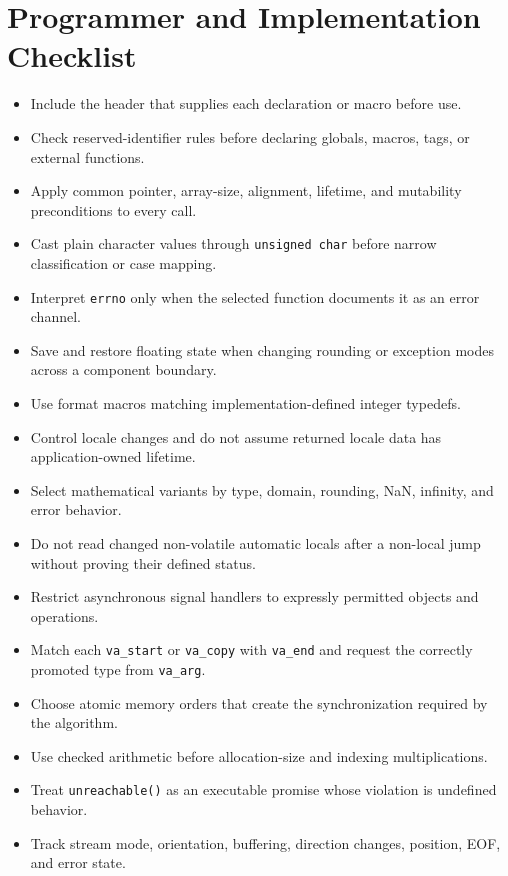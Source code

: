 \documentclass[10pt,letterpaper]{article}
\begin{document}
\section{Programmer and Implementation Checklist}
\begin{itemize}
  \item[$\square$] Include the header that supplies each declaration or macro before use.
  \item[$\square$] Check reserved-identifier rules before declaring globals, macros, tags, or external functions.
  \item[$\square$] Apply common pointer, array-size, alignment, lifetime, and mutability preconditions to every call.
  \item[$\square$] Cast plain character values through \texttt{unsigned char} before narrow classification or case mapping.
  \item[$\square$] Interpret \texttt{errno} only when the selected function documents it as an error channel.
  \item[$\square$] Save and restore floating state when changing rounding or exception modes across a component boundary.
  \item[$\square$] Use format macros matching implementation-defined integer typedefs.
  \item[$\square$] Control locale changes and do not assume returned locale data has application-owned lifetime.
  \item[$\square$] Select mathematical variants by type, domain, rounding, NaN, infinity, and error behavior.
  \item[$\square$] Do not read changed non-volatile automatic locals after a non-local jump without proving their defined status.
  \item[$\square$] Restrict asynchronous signal handlers to expressly permitted objects and operations.
  \item[$\square$] Match each \texttt{va\_start} or \texttt{va\_copy} with \texttt{va\_end} and request the correctly promoted type from \texttt{va\_arg}.
  \item[$\square$] Choose atomic memory orders that create the synchronization required by the algorithm.
  \item[$\square$] Use checked arithmetic before allocation-size and indexing multiplications.
  \item[$\square$] Treat \texttt{unreachable()} as an executable promise whose violation is undefined behavior.
  \item[$\square$] Track stream mode, orientation, buffering, direction changes, position, EOF, and error state.

\end{itemize}
\end{document}
